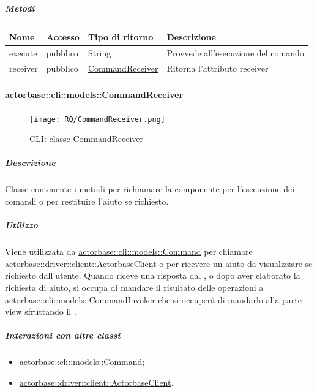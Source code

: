 \documentclass{scalatekids-article}
\begin{document}
\subparagraph{Metodi}

\begin{tabular}{| l | l | l | l |}
  \hline
  Nome & Accesso & Tipo di ritorno & Descrizione\\
  \hline
  execute & pubblico & String & Provvede all'esecuzione del comando\\
  \hline
  receiver & pubblico & \hyperref[sec:actorbase::cli::models::CommandReceiver]{CommandReceiver} & Ritorna l'attributo receiver\\
  \hline
\end{tabular}

\paragraph{actorbase::cli::models::CommandReceiver}
\label{sec:actorbase::cli::models::CommandReceiver}

\begin{figure}[H]
  \begin{center}
    \texttt{[image: RQ/CommandReceiver.png]}
    \caption{CLI: classe CommandReceiver}
  \end{center}
\end{figure}

\subparagraph{Descrizione}

Classe contenente i metodi per richiamare la componente  per
l'esecuzione dei comandi o per restituire l'aiuto se richiesto.

\subparagraph{Utilizzo}

Viene utilizzata da \hyperref[sec:actorbase::cli::models::Command]{actorbase::cli::models::Command} per chiamare
\hyperref[sec:actorbase::driver::client::ActorbaseClient]{actorbase::driver::client::ActorbaseClient} o per ricevere un aiuto da
visualizzare se richiesto dall'utente. Quando riceve una risposta dal , o dopo aver elaborato la richiesta
di aiuto, si occupa di mandare il risultato delle operazioni a \hyperref[sec:actorbase::cli::models::CommandInvoker]{actorbase::cli::models::CommandInvoker}
che si occuperà di mandarlo alla parte view sfruttando il  .

\subparagraph{Interazioni con altre classi}

\begin{itemize}
\item \hyperref[sec:actorbase::cli::models::Command]{actorbase::cli::models::Command};
\item \hyperref[sec:actorbase::driver::client::ActorbaseClient]{actorbase::driver::client::ActorbaseClient}.
\end{itemize}
\end{document}

